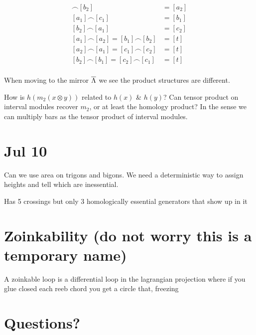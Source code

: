 \documentclass[11pt,oneside]{amsart}
\begin{document}
    \begin{align*}
        [c_1]\frown [b_2]&=[a_2]\\
        [a_1]\frown[c_1]&=[b_1]\\
        [b_2]\frown [a_1]&=[c_2]\\
        [a_1]\frown [a_2]=[b_1]\frown [b_2]&=[t]\\
        [a_2]\frown [a_1]=[c_1]\frown [c_2]&=[t]\\
        [b_2]\frown [b_1]=[c_2]\frown [c_1]&=[t]\\
    \end{align*}

When moving to the mirror $\overline{\Lambda}$ we see the product structures are different.

\begin{question}
    How is $h(m_2(x\otimes y))$ related to $h(x)$ \& $h(y)$?
    Can tensor product on interval modules recover $m_2$, or at least the homology product? In the sense we can multiply bars as the tensor product of interval modules.
\end{question}



\section{Jul 10}

\begin{question}
    Can we use area on trigons and bigons. We need a deterministic way to assign heights and tell which are inessential.
\end{question}

Has 5 crossings but only 3 homologically essential generators that show up in it



\section{Zoinkability (do not worry this is a temporary name)}


\begin{definition}
    A zoinkable loop is a differential loop in the lagrangian projection where if you glue closed each reeb chord you get a circle that, freezing 
\end{definition}






\section{Questions?}


\end{document}
